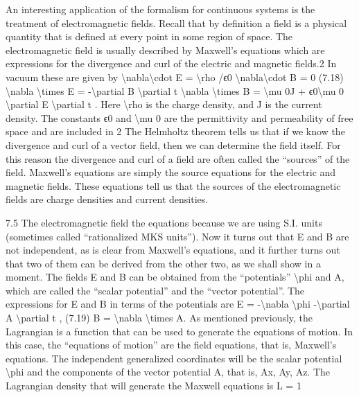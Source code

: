 An interesting application of the formalism for continuous systems is the treatment of electromagnetic fields.
Recall that by definition a field is a physical quantity that is defined at every
point in some region of space. The electromagnetic field is usually described
by Maxwell's equations which are expressions for the divergence and curl of
the electric and magnetic fields.2 In vacuum these are given by
\textbackslash{}nabla\textbackslash{}cdot  E = \textbackslash{}rho /ϵ0
\textbackslash{}nabla\textbackslash{}cdot  B = 0
(7.18)
\textbackslash{}nabla \textbackslash{}times  E = -\textbackslash{}partial B
\textbackslash{}partial t
\textbackslash{}nabla \textbackslash{}times  B = \textbackslash{}mu 0J + ϵ0\textbackslash{}mu 0
\textbackslash{}partial E
\textbackslash{}partial t .
Here \textbackslash{}rho  is the charge density, and J is the current density. The constants ϵ0
and \textbackslash{}mu 0 are the permittivity and permeability of free space and are included in
2 The Helmholtz theorem tells us that if we know the divergence and curl of a vector field, then
we can determine the field itself. For this reason the divergence and curl of a field are often
called the ``sources'' of the field. Maxwell's equations are simply the source equations for the
electric and magnetic fields. These equations tell us that the sources of the electromagnetic
fields are charge densities and current densities.

7.5
The electromagnetic field
the equations because we are using S.I. units (sometimes called ``rationalized
MKS units'').
Now it turns out that E and B are not independent, as is clear from Maxwell's
equations, and it further turns out that two of them can be derived from the
other two, as we shall show in a moment.
The fields E and B can be obtained from the ``potentials'' \textbackslash{}phi  and A, which
are called the ``scalar potential'' and the ``vector potential''. The expressions for
E and B in terms of the potentials are
E = -\textbackslash{}nabla \textbackslash{}phi  -\textbackslash{}partial A
\textbackslash{}partial t ,
(7.19)
B = \textbackslash{}nabla \textbackslash{}times  A.
As mentioned previously, the Lagrangian is a function that can be used to
generate the equations of motion. In this case, the ``equations of motion'' are
the field equations, that is, Maxwell's equations. The independent generalized
coordinates will be the scalar potential \textbackslash{}phi  and the components of the vector
potential A, that is, Ax, Ay, Az.
The Lagrangian density that will generate the Maxwell equations is
L = 1

